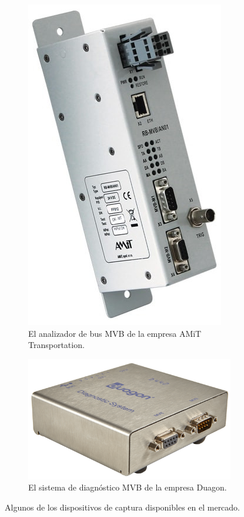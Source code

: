 \begin{figure}[htbp!]
\begin{subfigure}[b]{0.45\textwidth}
        \includegraphics[height=17\baselineskip]{./Figures/amit.jpg}
        \caption[AMiT Transportation -- WTB and MVB Analyzers]{El analizador de bus MVB de la empresa AMiT Transportation.}
        \label{fig:amit}
    \end{subfigure}
    \hfill
    \begin{subfigure}[b]{0.6\textwidth}
        \centering
        \includegraphics[width=1\textwidth]{./Figures/duagon.png}
        \caption[Duagon -- D442 MVB Diagnostic System]{El sistema de diagnóstico MVB de la empresa Duagon.}
        \label{fig:duagon}
    \end{subfigure}
    \caption{Algunos de los dispositivos de captura disponibles en el mercado.}
\end{figure}

